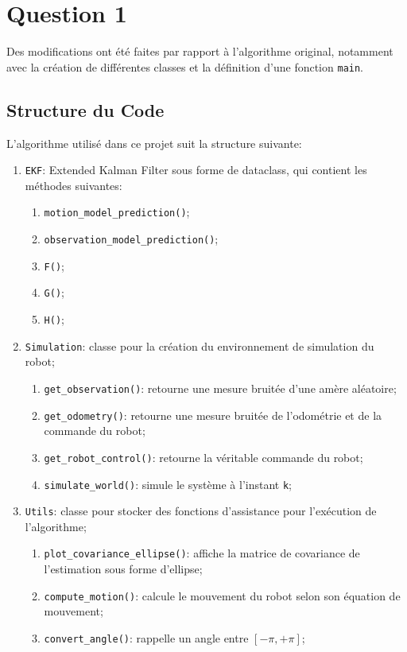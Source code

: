 \documentclass[../CSC_5RO12_TA_TP2.tex]{subfiles}
\begin{document}
\section{Question 1}
\begin{remark}
    Des modifications ont été faites par rapport à l'algorithme original, notamment avec la création de différentes classes et la définition d'une fonction \texttt{main}.
\end{remark}

\subsection{Structure du Code}
\noindent L'algorithme utilisé dans ce projet suit la structure suivante:
\begin{enumerate}
    \item \texttt{EKF}: Extended Kalman Filter sous forme de dataclass, qui contient les méthodes suivantes:
    \begin{enumerate}[noitemsep]
        \item \texttt{motion\_model\_prediction()};
        \item \texttt{observation\_model\_prediction()};
        \item \texttt{F()};
        \item \texttt{G()};
        \item \texttt{H()};
    \end{enumerate}
    \item \texttt{Simulation}: classe pour la création du environnement de simulation du robot;
    \begin{enumerate}[noitemsep]
        \item \texttt{get\_observation()}: retourne une mesure bruitée d'une amère aléatoire;
        \item \texttt{get\_odometry()}: retourne une mesure bruitée de l'odométrie et de la commande du robot;
        \item \texttt{get\_robot\_control()}: retourne la véritable commande du robot;
        \item \texttt{simulate\_world()}: simule le système à l'instant \texttt{k};
    \end{enumerate}
    \item \texttt{Utils}: classe pour stocker des fonctions d'assistance pour l'exécution de l'algorithme;
    \begin{enumerate}[noitemsep]
        \item \texttt{plot\_covariance\_ellipse()}: affiche la matrice de covariance de l'estimation sous forme d'ellipse;
        \item \texttt{compute\_motion()}: calcule le mouvement du robot selon son équation de mouvement;
        \item \texttt{convert\_angle()}: rappelle un angle entre $[-\pi, +\pi]$;
    \end{enumerate}
\end{enumerate}
\end{document}

